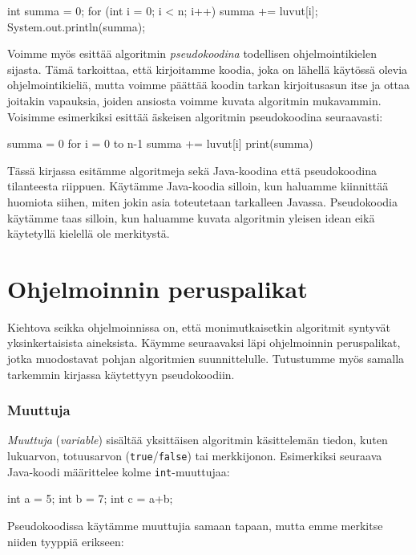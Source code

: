 \begin{code}
int summa = 0;
for (int i = 0; i < n; i++) {
    summa += luvut[i];
}
System.out.println(summa);
\end{code}


Voimme myös esittää algoritmin \emph{pseudokoodina}
todellisen ohjelmointikielen sijasta.
Tämä tarkoittaa, että kirjoitamme koodia,
joka on lähellä käytössä olevia ohjelmointikieliä, mutta voimme
päättää koodin tarkan kirjoitusasun itse ja ottaa joitakin vapauksia,
joiden ansiosta voimme kuvata algoritmin mukavammin.
Voisimme esimerkiksi esittää äskeisen algoritmin pseudokoodina seuraavasti:

\begin{code}
summa = 0
for i = 0 to n-1
    summa += luvut[i]
print(summa)
\end{code}

Tässä kirjassa esitämme algoritmeja sekä Java-koodina että pseudokoodina
tilanteesta riippuen.
Käytämme Java-koodia silloin, kun haluamme kiinnittää huomiota siihen,
miten jokin asia toteutetaan tarkalleen Javassa.
Pseudokoodia käytämme taas silloin, kun haluamme kuvata algoritmin yleisen
idean eikä käytetyllä kielellä ole merkitystä.

\section{Ohjelmoinnin peruspalikat}

Kiehtova seikka ohjelmoinnissa on, että monimutkaisetkin algoritmit
syntyvät yksinkertaisista aineksista.
Käymme seuraavaksi läpi ohjelmoinnin peruspalikat,
jotka muodostavat pohjan algoritmien suunnittelulle.
Tutustumme myös samalla tarkemmin kirjassa käytettyyn pseudokoodiin.

\subsubsection{Muuttuja}

\emph{Muuttuja} (\emph{variable}) sisältää yksittäisen algoritmin
käsittelemän tiedon, kuten lukuarvon, totuusarvon (\texttt{true}/\texttt{false}) tai merkkijonon.
Esimerkiksi seuraava Java-koodi määrittelee kolme \texttt{int}-muuttujaa:

\begin{code}
int a = 5;
int b = 7;
int c = a+b;
\end{code}

Pseudokoodissa käytämme muuttujia samaan tapaan,
mutta emme merkitse niiden tyyppiä erikseen:

